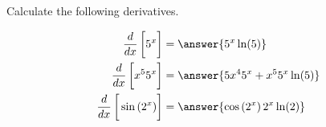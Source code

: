 \documentclass{ximera}
\author{Nela Lakos \and Kyle Parson}
\begin{document}
\begin{exercise}


Calculate the following derivatives.

\begin{align*}
\ddx\left[\vphantom{\ddx}5^x\right] &= \answer{5^x\ln(5)}\\
\ddx\left[\vphantom{\ddx}x^{5}5^x\right] &= \answer{5x^4 5^x + x^5 5^x\ln(5)}\\
\ddx\left[\vphantom{\ddx}\sin\left(2^x\right)\right]  &= \answer{\cos\left(2^{x}\right)2^{x}\ln(2)}
\end{align*}
\end{exercise}
\end{document}

